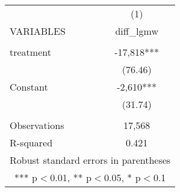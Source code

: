 \begin{tabular}{lc} \hline
 & (1) \\
VARIABLES & diff\_lgmw \\ \hline
 &  \\
treatment & -17,818*** \\
 & (76.46) \\
Constant & -2,610*** \\
 & (31.74) \\
 &  \\
Observations & 17,568 \\
 R-squared & 0.421 \\ \hline
\multicolumn{2}{c}{ Robust standard errors in parentheses} \\
\multicolumn{2}{c}{ *** p$<$0.01, ** p$<$0.05, * p$<$0.1} \\
\end{tabular}
